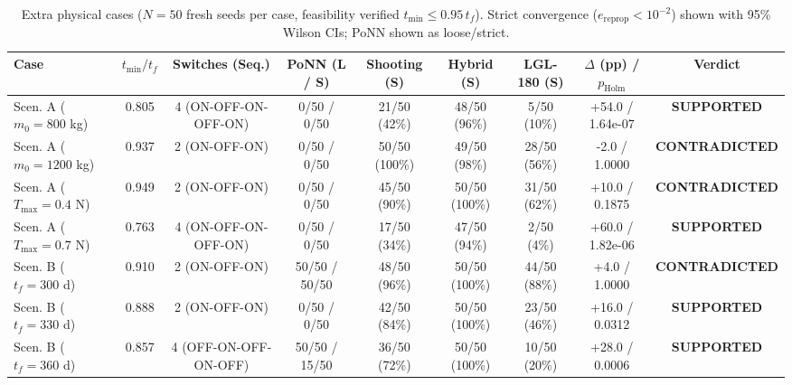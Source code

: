 \begin{table}[t]
\centering
\caption{Extra physical cases ($N=50$ fresh seeds per case, feasibility verified $t_{\min}\le 0.95\,t_f$). Strict convergence ($e_{\mathrm{reprop}}<10^{-2}$) shown with 95\% Wilson CIs; PoNN shown as loose/strict.}
\label{tab:extra_cases}
\begin{tabular}{lcccccccc}
\toprule
Case & $t_{\min}/t_f$ & Switches (Seq.) & PoNN (L / S) & Shooting (S) & Hybrid (S) & LGL-180 (S) & $\Delta$ (pp) / $p_{\mathrm{Holm}}$ & Verdict \\
\midrule
Scen. A ($m_0=800$ kg) & 0.805 & 4 (ON-OFF-ON-OFF-ON) & 0/50 / 0/50 & 21/50 (42\%) & 48/50 (96\%) & 5/50 (10\%) & +54.0 / 1.64e-07 & \textbf{SUPPORTED} \\
Scen. A ($m_0=1200$ kg) & 0.937 & 2 (ON-OFF-ON) & 0/50 / 0/50 & 50/50 (100\%) & 49/50 (98\%) & 28/50 (56\%) & -2.0 / 1.0000 & \textbf{CONTRADICTED} \\
Scen. A ($T_{\max}=0.4$ N) & 0.949 & 2 (ON-OFF-ON) & 0/50 / 0/50 & 45/50 (90\%) & 50/50 (100\%) & 31/50 (62\%) & +10.0 / 0.1875 & \textbf{CONTRADICTED} \\
Scen. A ($T_{\max}=0.7$ N) & 0.763 & 4 (ON-OFF-ON-OFF-ON) & 0/50 / 0/50 & 17/50 (34\%) & 47/50 (94\%) & 2/50 (4\%) & +60.0 / 1.82e-06 & \textbf{SUPPORTED} \\
Scen. B ($t_f=300$ d) & 0.910 & 2 (ON-OFF-ON) & 50/50 / 50/50 & 48/50 (96\%) & 50/50 (100\%) & 44/50 (88\%) & +4.0 / 1.0000 & \textbf{CONTRADICTED} \\
Scen. B ($t_f=330$ d) & 0.888 & 2 (ON-OFF-ON) & 0/50 / 0/50 & 42/50 (84\%) & 50/50 (100\%) & 23/50 (46\%) & +16.0 / 0.0312 & \textbf{SUPPORTED} \\
Scen. B ($t_f=360$ d) & 0.857 & 4 (OFF-ON-OFF-ON-OFF) & 50/50 / 15/50 & 36/50 (72\%) & 50/50 (100\%) & 10/50 (20\%) & +28.0 / 0.0006 & \textbf{SUPPORTED} \\
\bottomrule
\end{tabular}
\end{table}
